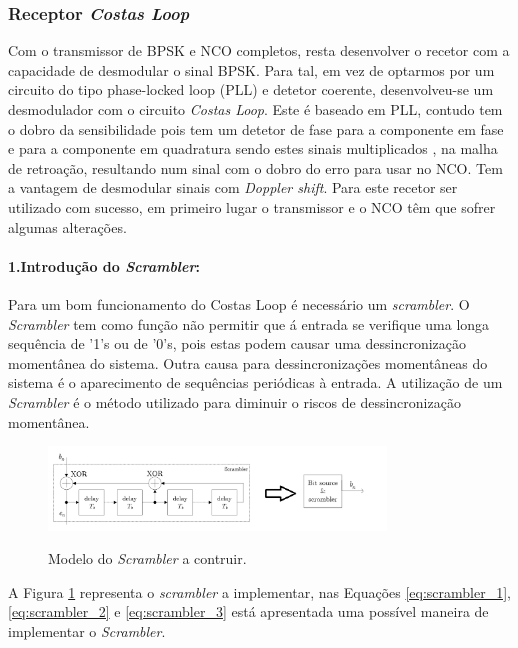 \documentclass[11pt]{article}
\numberwithin{equation}{section}
\begin{document}
\subsubsection{Receptor \textit{Costas Loop}}
Com o transmissor de BPSK e NCO completos, resta desenvolver o recetor com a capacidade de desmodular o sinal BPSK. Para tal, em vez de optarmos por um circuito do tipo phase-locked loop (PLL) e detetor coerente, desenvolveu-se um desmodulador com o circuito \textit{Costas Loop}. Este é baseado em PLL, contudo tem o dobro da sensibilidade pois tem um detetor de fase para a componente em fase e para a componente em quadratura sendo estes sinais multiplicados , na malha de retroação, resultando num sinal com o dobro do erro para usar no NCO. Tem a vantagem de desmodular sinais com \textit{Doppler shift}. Para este recetor ser utilizado com sucesso, em primeiro lugar o transmissor e o NCO têm que sofrer algumas alterações.

\paragraph{1.Introdução do \textit{Scrambler}:} \hspace{0pt}
\label{para:P3-1}


Para um bom funcionamento do Costas Loop é necessário um \textit{scrambler}. O \textit{Scrambler} tem como função não permitir que á entrada se verifique uma longa sequência de '1's ou de '0's, pois estas podem causar uma dessincronização momentânea do sistema. Outra causa para dessincronizações momentâneas do sistema é o aparecimento de sequências periódicas à entrada. A utilização de um \textit{Scrambler} é o  método utilizado para diminuir o riscos de dessincronização momentânea.
\begin{figure}[H]
	\centering
	\includegraphics[width=0.8\textwidth]{./Scrambler}~\\
	\caption{Modelo do \textit{Scrambler} a contruir.}
	\label{fig:scrambler}
\end{figure}

A Figura \ref{fig:scrambler} representa o \textit{scrambler} a implementar, nas Equações \ref{eq:scrambler_1}, \ref{eq:scrambler_2} e \ref{eq:scrambler_3} está apresentada uma possível maneira de implementar o \textit{Scrambler}.
\end{document}
